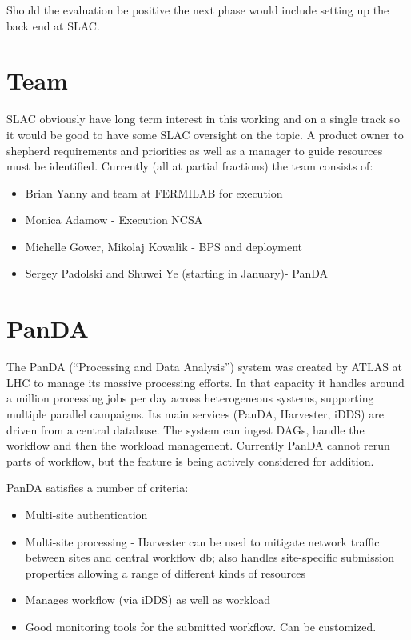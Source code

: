 Should the evaluation be positive the next phase would include setting up the back end at SLAC.

\section {Team }\label{sec:team}
SLAC obviously have long term interest in this working and on a single track so it would be good to have some SLAC oversight on the topic.
A product owner to shepherd requirements and priorities as well as  a manager to guide resources must be identified.
 Currently (all at partial fractions) the team consists of:
\begin{itemize}
\item Brian Yanny and team at FERMILAB for execution
\item Monica Adamow - Execution NCSA
\item Michelle Gower, Mikolaj Kowalik  - BPS and deployment
\item Sergey Padolski and Shuwei Ye (starting in January)- PanDA
\end{itemize}

\section{PanDA}

The PanDA (``Processing and Data Analysis'') system was created by
ATLAS at LHC to manage its massive processing efforts. In that
capacity it handles  around a million  processing jobs per day
across heterogeneous systems, supporting multiple parallel
campaigns. Its main services (PanDA, Harvester, iDDS) are driven from
a central database. The system can ingest DAGs, handle the workflow
and then the workload management. Currently PanDA cannot rerun parts
of workflow, but the feature is being actively considered for addition.

PanDA satisfies a number of criteria:
\begin{itemize}
\item Multi-site authentication
\item Multi-site processing - Harvester can be used to mitigate network traffic between sites and central workflow db; also handles site-specific submission properties allowing a range of different kinds of resources
\item Manages workflow (via iDDS) as well as workload
\item Good monitoring tools for the submitted workflow. Can be customized.
\end{itemize}

